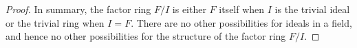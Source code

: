\documentclass[12pt]{amsart}
\theoremstyle{definition}
\numberwithin{equation}{section}
\theoremstyle{plain}
\begin{document}
\begin{exercise}{24}
\begin{proof}
    In summary, the factor ring \( F/I \) is either \( F \) itself when \( I \) is the trivial ideal or the trivial ring when \( I = F \). There are no other possibilities for ideals in a field, and hence no other possibilities for the structure of the factor ring \( F/I \).
\end{proof}
\end{exercise}
    
\end{document}
